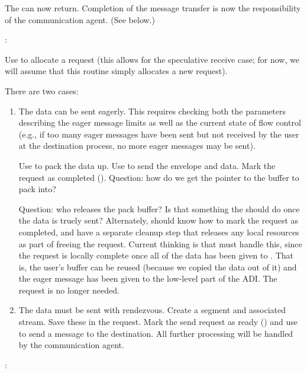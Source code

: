 \begin{mmadi}
\begin{tcp}
\begin{enumerate}
\begin{enumerate}
  The  can now return.  Completion of the message transfer
  is now the responsibility of the communication agent.  (See below.)

\end{enumerate}

\end{enumerate}
:

Use  to allocate a request (this allows for
the speculative receive case; for now, we will assume that this routine simply
allocates a new request).  

There are two cases:
\begin{enumerate}
\item The data can be sent eagerly.  This requires checking both the
  parameters describing the eager message limits as well as the current state
  of flow control (e.g., if too many eager messages have been sent but not
  received by the user at the destination process, no more eager messages may
  be sent).

Use  to pack the data up.  Use  to
send the envelope and data.  Mark the request as completed
(). 
Question: how do we get the pointer to the buffer to pack into?

Question: who releases the pack buffer?  Is that something the
 should do once the data is truely sent?  Alternately,
should  know how to mark the request as completed, and
have a separate cleanup step that releases any local resources as part of
freeing the request.  Current thinking is that  must
handle this, since the request is locally complete once all of the data has
been given to .  That is, the user's buffer can be reused
(because we copied the data out of it) and the eager message has been given to
the low-level part of the ADI.  The request is no longer needed.  

\item The data must be sent with rendezvous.
Create a segment and associated stream.  Save these in the request.
Mark the send request as ready () and use
 to send a  message to
the destination.  All further processing will be handled by the communication
agent. 
\end{enumerate}

:


\end{tcp}
\end{mmadi}
